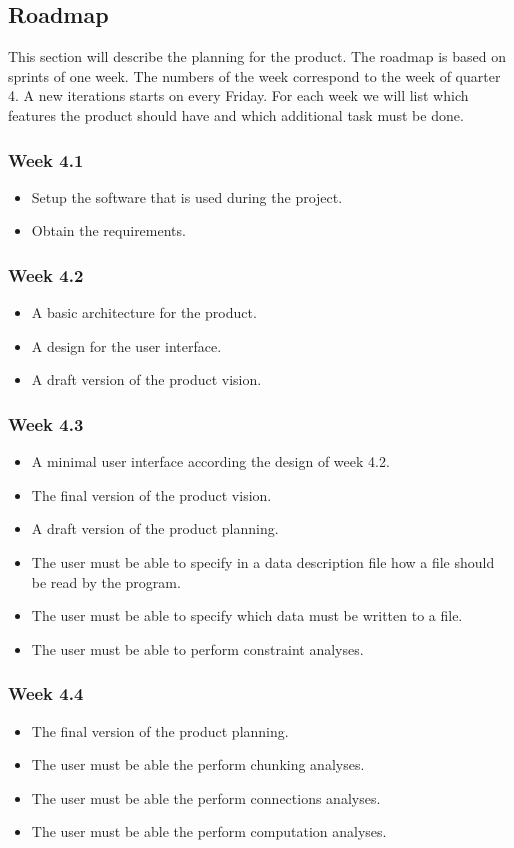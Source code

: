 \subsection{Roadmap}
This section will describe the planning for the product. The roadmap is based on sprints of one week. The numbers of the week correspond to the week of quarter 4. A new iterations starts on every Friday. For each week we will list which features the product should have and which additional task must be done.
\subsubsection{Week 4.1}
\begin{itemize}
	\item Setup the software that is used during the project.
	\item Obtain the requirements.
\end{itemize}

\subsubsection{Week 4.2}
\begin{itemize}
\item A basic architecture for the product.
\item A design for the user interface.
\item A draft version of the product vision.
\end{itemize}
\subsubsection{Week 4.3}
\begin{itemize}
	\item A minimal user interface according the design of week 4.2.
	\item The final version of the product vision.
	\item A draft version of the product planning.
	\item The user must be able to specify in a data description file how a file should be read by the program.
	\item The user must be able to specify which data must be written to a file.
	\item The user must be able to perform constraint analyses.
\end{itemize}
\subsubsection{Week 4.4}
\begin{itemize}
	\item The final version of the product planning.
	\item The user must be able the perform chunking analyses.
	\item The user must be able the perform connections analyses.
	\item The user must be able the perform computation analyses.
\end{itemize}
